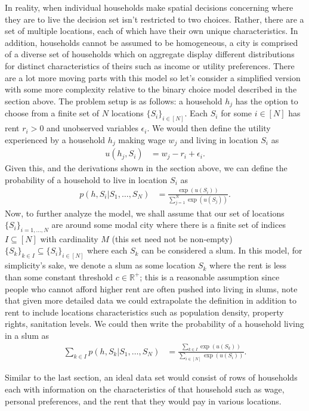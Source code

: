 In reality, when individual households make spatial decisions concerning where they are to live the decision set isn't restricted to two choices. Rather, there are a set of multiple locations, each of which have their own unique characteristics. In addition, households cannot be assumed to be homogeneous, a city is comprised of a diverse set of households which on aggregate display different distributions for distinct characteristics of theirs such as income or utility preferences. There are a lot more moving parts with this model so let's consider a simplified version with some more complexity relative to the binary choice model described in the section above. The problem setup is as follows: a household $h_j$ has the option to choose from a finite set of $N$ locations $\{S_i\}_{i\in[N]}$. Each $S_i$ for some $i\in [N]$ has rent $r_i>0$ and unobserved variables $\epsilon_i$. We would then define the utility experienced by a household $h_j$ making wage $w_j$ and living in location $S_i$ as 
\begin{align}
    u(h_j, S_i) &= w_j - r_i + \epsilon _i.
\end{align}
Given this, and the derivations shown in the section above, we can define the probability of a household to live in location $S_i$ as \begin{align}
    p(h,S_i|S_1,\ldots,S_N) &= \frac{\exp{(u(S_i))}}{\sum_{j=1}^N\exp{(u(S_j))}}.
\end{align}
Now, to further analyze the model, we shall assume that our set of locations $\{S_i\}_{i=1,\ldots,N}$ are around some modal city where there is a finite set of indices $I\subseteq [N]$ with cardinality $M$ (this set need not be non-empty) $\{S_{k}\}_{k\in I}\subseteq \{S_i\}_{i\in[N]}$ where each $S_{k}$ can be considered a slum. In this model, for simplicity's sake, we denote a slum as some location $S_k$ where the rent is less than some constant threshold $c\in  \mathbb{R}^+$; this is a reasonable assumption since people who cannot afford higher rent are often pushed into living in slums, note that given more detailed data we could extrapolate the definition in addition to rent to include locations characteristics such as population density, property rights, sanitation levels. We could then write the probability of a household living in a slum as \begin{align}
    \sum_{k\in I}p(h,S_k|S_1,\ldots, S_N) &= \frac{\sum_{k\in I}\exp(u(S_k))}{\sum_{i\in [N]}\exp(u(S_i))}.
\end{align}

Similar to the last section, an ideal data set would consist of rows of households each with information on the characteristics of that household such as wage, personal preferences, and the rent that they would pay in various locations.